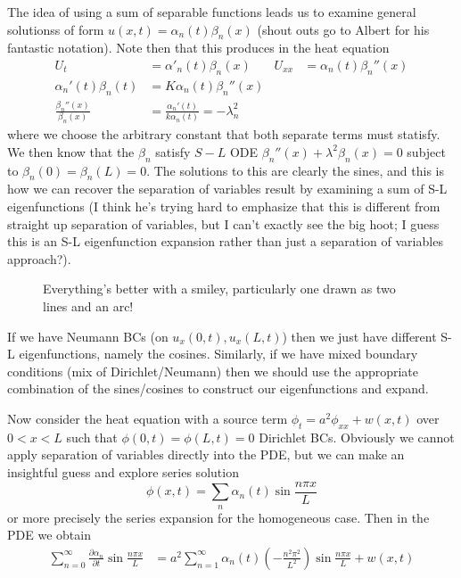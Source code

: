 \documentclass[10pt]{report}
\newcommand{\pd}[2]{\frac{\partial #1}{\partial#2}}
\begin{document}
The idea of using a sum of separable functions leads us to examine general solutionss of form $u(x,t) = \alpha_n(t)\beta_n(x)$ (shout outs go to Albert for his fantastic notation). Note then that this produces in the heat equation
\begin{align}
    U_t &= \alpha'_n(t) \beta_n(x) & U_{xx} &= \alpha_n(t) \beta_{n}''(x)\\
    \alpha_n'(t)\beta_n(t) &= K\alpha_n(t)\beta_n''(x)\\
    \frac{\beta_n''(x)}{\beta_n(x)} &= \frac{\alpha_n'(t)}{k\alpha_n(t)} = -\lambda_n^2
\end{align}
where we choose the arbitrary constant that both separate terms must statisfy. We then know that the $\beta_n$ satisfy $S-L$ ODE $\beta_n''(x) + \lambda^2 \beta_n(x) = 0$ subject to $\beta_n(0) = \beta_n(L) = 0$. The solutions to this are clearly the sines, and this is how we can recover the separation of variables result by examining a sum of S-L eigenfunctions (I think he's trying hard to emphasize that this is different from straight up separation of variables, but I can't exactly see the big hoot; I guess this is an S-L eigenfunction expansion rather than just a separation of variables approach?).
\begin{figure}[!h]
    \centering
    \caption{Everything's better with a smiley, particularly one drawn as two lines and an arc!}
\end{figure}

If we have Neumann BCs (on $u_x(0,t), u_x(L,t)$) then we just have different S-L eigenfunctions, namely the cosines. Similarly, if we have mixed boundary conditions (mix of Dirichlet/Neumann) then we should use the appropriate combination of the sines/cosines to construct our eigenfunctions and expand. 

Now consider the heat equation with a source term $\phi_t = a^2 \phi_{xx} + w(x,t)$ over $0 < x < L$ such that $\phi(0,t) = \phi(L,t) = 0$ Dirichlet BCs. Obviously we cannot apply separation of variables directly into the PDE, but we can make an insightful guess and explore series solution
\begin{equation}
    \phi(x,t) = \sum_{n}^{}\alpha_n(t)\sin \frac{n\pi x}{L}
\end{equation}
or more precisely the series expansion for the homogeneous case. Then in the PDE we obtain
\begin{align}
    \sum_{n=0}^{\infty}\pd{\alpha_n}{t}\sin \frac{n\pi x}{L} &= a^2 \sum_{n=1}^{\infty} \alpha_n(t) \left( -\frac{n^2 \pi^2}{L^2} \right)\sin \frac{n\pi x}{L} + w(x,t)\label{5.9.PDE}
\end{align}
\end{document}
